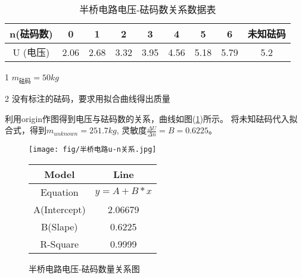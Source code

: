 \documentclass[a4paper,UTF8]{ctexart}
\begin{document}
\begin{table}[!hp]
    \begin{center}
        \begin{threeparttable}
            \caption{半桥电路电压-砝码数关系数据表}
            \begin{tabular}{|c|c|c|c|c|c|c|c|c|}
                \hline
                n\tnote{1}(砝码数) & 0 & 1 & 2 & 3 & 4 & 5 & 6 & 未知砝码\tnote{2}\\
                \hline
                U (电压) & 2.06 & 2.68 & 3.32 & 3.95 & 4.56 & 5.18 & 5.79 & 5.2\\
                \hline
            \end{tabular}
            \label{table:3}
            \begin{tablenotes}
                \footnotesize
                \item[1] $m_{砝码}=50kg$
                \item[2] 没有标注的砝码，要求用拟合曲线得出质量
            \end{tablenotes}
        \end{threeparttable}
    \end{center}
\end{table}
利用origin作图得到电压与砝码数的关系，曲线如图(\ref*{fig:7})所示。
将未知砝码代入拟合式，得到$m_{unknown}=251.7kg$,
灵敏度$\frac{\Delta U}{\Delta n}=B=0.6225$。
\begin{figure}[!hp]
    \begin{minipage}{0.65\linewidth}
        \centering
        \texttt{[image: fig/半桥电路u-n关系.jpg]}
        \label{fig:7}
    \end{minipage}
    \hfill
    \begin{minipage}{0.3\linewidth}
        \begin{center}
            \begin{tabular}{c|c}
                \hline
                Model & Line\\
                \hline
                Equation & $y=A+B*x$\\
                \hline
                A(Intercept) & 2.06679\\
                \hline
                B(Slape) & 0.6225\\
                \hline
                R-Square & 0.9999\\
                \hline
            \end{tabular}
        \end{center}
    \end{minipage}
    \caption{半桥电路电压-砝码数量关系图}
\end{figure}
\end{document}
